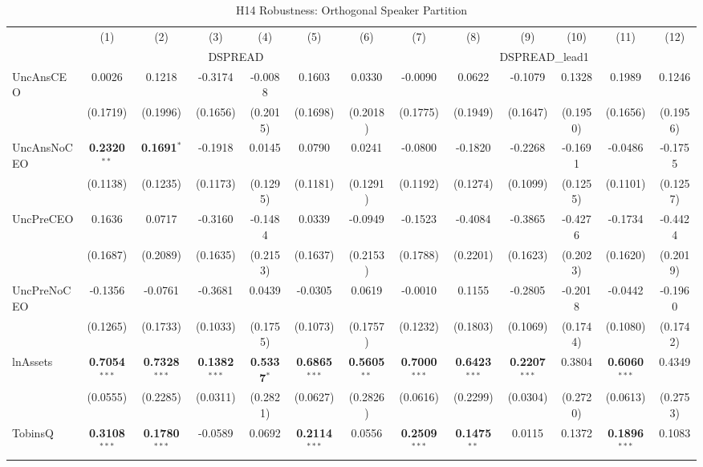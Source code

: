 \begin{landscape}
\begin{table}[H]
\setlength{\tabcolsep}{3pt}
\renewcommand{\arraystretch}{0.85}
\centering
\caption{H14 Robustness: Orthogonal Speaker Partition}
\label{tab:h14_robust}
\scriptsize
\begin{tabular}{lcccccccccccc}
\toprule
 & (1) & (2) & (3) & (4) & (5) & (6) & (7) & (8) & (9) & (10) & (11) & (12) \\
 & \multicolumn{6}{c}{DSPREAD} & \multicolumn{6}{c}{DSPREAD\_lead1} \\
\cmidrule(lr){2-7} \cmidrule(lr){8-13}
\midrule
UncAnsCEO & 0.0026 & 0.1218 & -0.3174 & -0.0088 & 0.1603 & 0.0330 & -0.0090 & 0.0622 & -0.1079 & 0.1328 & 0.1989 & 0.1246 \\
 & (0.1719) & (0.1996) & (0.1656) & (0.2015) & (0.1698) & (0.2018) & (0.1775) & (0.1949) & (0.1647) & (0.1950) & (0.1656) & (0.1956) \\
UncAnsNoCEO & \textbf{0.2320}$^{**}$ & \textbf{0.1691}$^{*}$ & -0.1918 & 0.0145 & 0.0790 & 0.0241 & -0.0800 & -0.1820 & -0.2268 & -0.1691 & -0.0486 & -0.1755 \\
 & (0.1138) & (0.1235) & (0.1173) & (0.1295) & (0.1181) & (0.1291) & (0.1192) & (0.1274) & (0.1099) & (0.1255) & (0.1101) & (0.1257) \\
UncPreCEO & 0.1636 & 0.0717 & -0.3160 & -0.1484 & 0.0339 & -0.0949 & -0.1523 & -0.4084 & -0.3865 & -0.4276 & -0.1734 & -0.4424 \\
 & (0.1687) & (0.2089) & (0.1635) & (0.2153) & (0.1637) & (0.2153) & (0.1788) & (0.2201) & (0.1623) & (0.2023) & (0.1620) & (0.2019) \\
UncPreNoCEO & -0.1356 & -0.0761 & -0.3681 & 0.0439 & -0.0305 & 0.0619 & -0.0010 & 0.1155 & -0.2805 & -0.2018 & -0.0442 & -0.1960 \\
 & (0.1265) & (0.1733) & (0.1033) & (0.1755) & (0.1073) & (0.1757) & (0.1232) & (0.1803) & (0.1069) & (0.1744) & (0.1080) & (0.1742) \\
\midrule
lnAssets & \textbf{0.7054}$^{***}$ & \textbf{0.7328}$^{***}$ & \textbf{0.1382}$^{***}$ & \textbf{0.5337}$^{*}$ & \textbf{0.6865}$^{***}$ & \textbf{0.5605}$^{**}$ & \textbf{0.7000}$^{***}$ & \textbf{0.6423}$^{***}$ & \textbf{0.2207}$^{***}$ & 0.3804 & \textbf{0.6060}$^{***}$ & 0.4349 \\
 & (0.0555) & (0.2285) & (0.0311) & (0.2821) & (0.0627) & (0.2826) & (0.0616) & (0.2299) & (0.0304) & (0.2720) & (0.0613) & (0.2753) \\
TobinsQ & \textbf{0.3108}$^{***}$ & \textbf{0.1780}$^{***}$ & -0.0589 & 0.0692 & \textbf{0.2114}$^{***}$ & 0.0556 & \textbf{0.2509}$^{***}$ & \textbf{0.1475}$^{**}$ & 0.0115 & 0.1372 & \textbf{0.1896}$^{***}$ & 0.1083 \\

\end{tabular}
\end{table}
\end{landscape}
